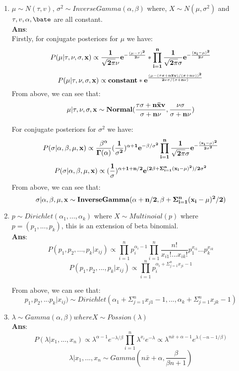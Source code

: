 \documentclass{article}
\begin{document}
\begin{enumerate}
\item $\mu \sim N(\tau,v)$, $\sigma^2 \sim InverseGamma(\alpha, \beta)$ where, $X \sim N(\mu, \sigma^2)$ and $\tau, v,\alpha, \bate$ are all constant.  \\
\textbf{Ans}: \\
Firstly, for conjugate posteriors for $\mu$ we have: 
$$P(\mu|\tau,\nu,\sigma,\bf{x}) \propto \frac{1}{\sqrt{2\pi}\nu}e^{-\frac{(\mu-\tau)^2}{2\nu}} * \prod_{i=1}^{n}\frac{1}{\sqrt{2\pi}\sigma}e^{-\frac{(x_i-\mu)^2}{2\sigma}}$$
$$ P(\mu|\tau,\nu,\sigma,\bf{x}) \propto constant * e^{\frac{(\mu-(\tau\sigma+n\bar{x}v)/(\sigma+n\nu))^2}{2\nu\sigma/(\sigma+n\nu)}}$$
From above, we can see that: \\
$$\mu|\tau,\nu,\sigma,\bf{x}\sim Normal(\frac{\tau\sigma+n\bar{x}v}{\sigma+n\nu},\frac{\nu\sigma}{\sigma+n\nu})$$

For conjugate posteriors for $\sigma^2$ we have: \\
$$P(\sigma|\alpha,\beta,\mu,\bf{x})\propto \frac{\beta^{\alpha}}{\Gamma(\alpha)}(\frac{1}{\sigma^2})^{\alpha+1}e^{-\beta/\sigma^2}\prod_{i=1}^{n}\frac{1}{\sqrt{2\pi}\sigma}e^{-\frac{(x_i-\mu)^2}{2\sigma^2}}$$
$$ P(\sigma|\alpha,\beta,\mu,\bf{x}) \propto (\frac{1}{\sigma})^{\alpha+1+n/2}e^{(2\beta+\Sigma_{i=1}^{n}(x_i-\mu)^2)/2\sigma^2}$$
From above, we can see that: \\
$$\sigma|\alpha,\beta,\mu,\bf{x}\sim InverseGamma(\alpha+n/2,\beta+\Sigma_{i=1}^{n}(x_i-\mu)^2/2)$$

\item $p\sim Dirichlet(\alpha_1,...,\alpha_k)$ where $X \sim Multinoial(p) $ where $p=(p_1,...,p_k)$, this is an extension of beta binomial. \\
\textbf{Ans}: \\

$$P(p_1,p_2,...,p_k|x_{ij})\propto \prod_{i=1}^{n}p_i^{\alpha_i-1}\prod_{i=1}^{n}\frac{n!}{x_{i1}!...x_{ik}!}p_1^{x_{i1}}...p_k^{x_{ik}}$$
$$P(p_1,p_2,...,p_k|x_{ij})\propto \prod_{i=1}^{n}p_i^{\alpha_i+\Sigma_{j=1}^{n}x_{ji}-1}$$

From above, we can see that: 
$$p_1,p_2,...p_k|x_{ij}) \sim Dirichlet(\alpha_1+\Sigma_{j=1}^{n}x_{j1}-1,...,\alpha_k+\Sigma_{j=1}^{n}x_{jk}-1)$$

\item $\lambda \sim Gamma(\alpha, \beta) where X \sim Possion(\lambda)$ \\
\textbf{Ans}: \\
$$P(\lambda|x_1,...,x_n)\propto  \lambda^{\alpha-1}e^{-\lambda/\beta}\prod_{i=1}^n\lambda^{x_i}e^{-\lambda}\propto \lambda^{n\bar{x}+\alpha-1}e^{\lambda(-n-1/\beta)}$$
$$\lambda|x_1,...,x_n\sim Gamma(n\bar{x}+\alpha,\frac{\beta}{\beta n +1})$$

\end{enumerate}
\end{document}
